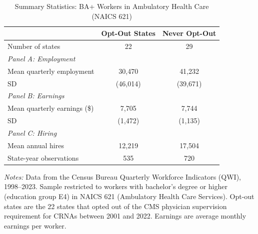 
\begin{table}[htbp]
\centering
\caption{Summary Statistics: BA+ Workers in Ambulatory Health Care (NAICS 621)}
\label{tab:summary}
\begin{threeparttable}
\begin{tabular}{lcc}
\toprule
 & Opt-Out States & Never Opt-Out \\
\midrule
Number of states & 22 & 29 \\
\addlinespace
\textit{Panel A: Employment} & & \\
\quad Mean quarterly employment & 30,470 & 41,232 \\
\quad SD & (46,014) & (39,671) \\
\addlinespace
\textit{Panel B: Earnings} & & \\
\quad Mean quarterly earnings (\$) & 7,705 & 7,744 \\
\quad SD & (1,472) & (1,135) \\
\addlinespace
\textit{Panel C: Hiring} & & \\
\quad Mean annual hires & 12,219 & 17,504 \\
\addlinespace
State-year observations & 535 & 720 \\
\bottomrule
\end{tabular}
\begin{tablenotes}[flushleft]
\small
\item \textit{Notes:} Data from the Census Bureau Quarterly Workforce Indicators (QWI), 1998--2023. Sample restricted to workers with bachelor's degree or higher (education group E4) in NAICS 621 (Ambulatory Health Care Services). Opt-out states are the 22 states that opted out of the CMS physician supervision requirement for CRNAs between 2001 and 2022. Earnings are average monthly earnings per worker.
\end{tablenotes}
\end{threeparttable}
\end{table}

